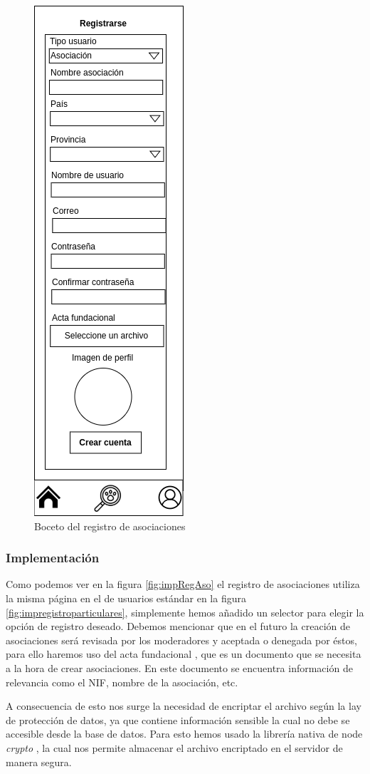 \begin{figure}[H]
	\centering
	\includegraphics[width=0.31\linewidth]{sprint 3//hu8/registro_asociaciones.png}
	\caption{Boceto del registro de asociaciones}
	\label{fig:boceto_regAso}
\end{figure}

\subsubsection{Implementación}

Como podemos ver en la figura \ref{fig:impRegAso} el registro de asociaciones utiliza la misma página en el de usuarios estándar en la figura \ref{fig:impregistroparticulares}, simplemente hemos añadido un selector para elegir la opción de registro deseado. Debemos mencionar que en el futuro la creación de asociaciones será revisada por los moderadores y aceptada o denegada por éstos, para ello haremos uso del acta fundacional \cite{actaFundacional}, que es un documento que se necesita a la hora de crear asociaciones. En este documento se encuentra información de relevancia como el NIF, nombre de la asociación, etc.

A consecuencia de esto nos surge la necesidad de encriptar el archivo según la lay de protección de datos, ya que contiene información sensible la cual no debe se accesible desde la base de datos. Para esto hemos usado la librería nativa de node \textit{crypto} \cite{crypto}, la cual nos permite almacenar el archivo encriptado en el servidor de manera segura.


